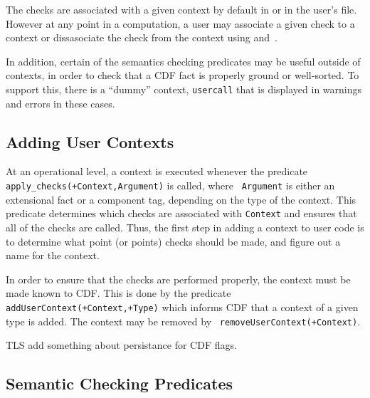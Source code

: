 The checks are associated with a given context by default in
 or in the user's  file.  However at
any point in a computation, a user may associate a given check to a
context or dissasociate the check from the context using
 and~.

In addition, certain of the semantics checking predicates may be
useful outside of contexts, in order to check that a CDF fact is
properly ground or well-sorted.  To support this, there is a ``dummy''
context, {\tt usercall} that is displayed in warnings and errors in
these cases.


\subsection{Adding User Contexts}

At an operational level, a context is executed whenever the predicate
{\tt apply\_checks(+Context,Argument)} is called, where {\tt
Argument} is either an extensional fact or a component tag, depending
on the type of the context.  This predicate determines which checks
are associated with {\tt Context} and ensures that all of the checks
are called.  Thus, the first step in adding a context to user code is
to determine what point (or points) checks should be made, and figure
out a name for the context.

In order to ensure that the checks are performed properly, the context
must be made known to CDF.  This is done by the predicate {\tt
addUserContext(+Context,+Type)} which informs CDF that a context of a
given type is added.  The context may be removed by {\tt
removeUserContext(+Context)}.

{\sc TLS add something about persistance for CDF flags}.


\subsection{Semantic Checking Predicates} \label{sec:checkingapi}

